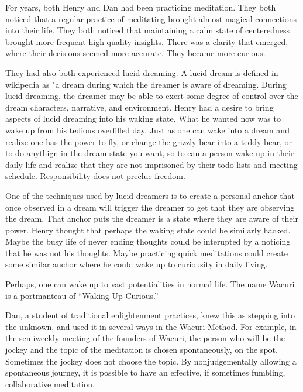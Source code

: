 \documentclass[12pt]{book}
\begin{document}
For years, both Henry and Dan had been practicing meditation. They
both noticed that a regular practice of meditating brought almost
magical connections into their life. They both noticed that
maintaining a calm state of centeredness brought more frequent high
quality insights. There was a clarity that emerged, where their
decisions seemed more accurate. They became more curious.

They had also both experienced lucid dreaming. A lucid dream is
defined in wikipedia as "a dream during which the dreamer is aware of
dreaming. During lucid dreaming, the dreamer may be able to exert some
degree of control over the dream characters, narrative, and
environment. Henry had a desire to bring aspects of lucid dreaming
into his waking state.  What he wanted now was to wake up from his
tedious overfilled day. Just as one can wake into a dream and realize
one has the power to fly, or change the grizzly bear into a teddy
bear, or to do anythign in the dream state you want, so to can a
person wake up in their daily life and realize that they are not
imprisoned by their todo lists and meeting schedule. Responsibility
does not preclue freedom.

One of the techniques used by lucid dreamers is to create a personal
anchor that once observed in a dream will trigger the dreamer to get
that they are observing the dream. That anchor puts the dreamer is a
state where they are aware of their power. Henry thought that perhaps
the waking state could be similarly hacked. Maybe the busy life of
never ending thoughts could be interupted by a noticing that he was
not his thoughts. Maybe practicing quick meditations could create some
similar anchor where he could wake up to curiousity in daily living.

Perhaps, one can wake up to vast potentialities in normal life. The name Wacuri is a portmanteau of ``Waking Up Curious.''

Dan, a student of traditional enlightenment practices, knew this
as stepping into the unknown, and used it in several ways
in the Wacuri Method.  For example, in the semiweekly meeting of the founders of
Wacuri, the person who will be the jockey and the topic of the meditation
is chosen spontaneously, on the
spot. Sometimes the jockey does not choose the topic. By nonjudgementally
allowing a spontaneous journey, it is possible to have an
effective, if sometimes fumbling, collaborative meditation.
\end{document}
